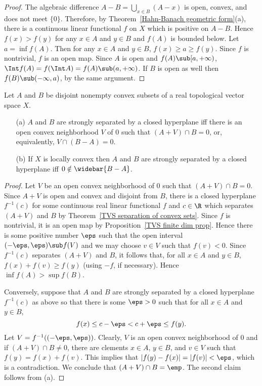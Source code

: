 \begin{proof}
The algebraic difference $A-B=\bigcup_{x\in B}(A-x)$ is open, convex, and does not meet $\{0\}$. Therefore, by Theorem~\ref{Hahn-Banach geometric form}(a), there is a continuous linear functional $f$ on $X$ which is positive on $A-B$. Hence $f(x)>f(y)$ for any $x\in A$ and $y\in B$ and $f(A)$ is bounded below. Let $a=\inf f(A)$. Then for any $x\in A$ and $y\in B$, $f(x)\geq a\geq f(y)$. Since $f$ is nontrivial, $f$ is an open map. Since $A$ is open and $f(A)\sub[a,+\infty)$, $\Int f(A)=f(\Int A)=f(A)\sub(a,+\infty)$. If $B$ is open as well then $f(B)\sub (-\infty,a)$, by the same argument.
\end{proof}
\begin{theorem}\label{TVS strong separation of convex sets}
Let $A$ and $B$ be disjoint nonempty convex subsets of a real topological vector space $X$.
\begin{itemize}
\item[(a)] $A$ and $B$ are strongly separated by a closed hyperplane iff there is an open convex neighborhood $V$ of $0$ such that $(A+V)\cap B=0$, or, equivalently, $V\cap (B-A)=0$.
\item[(b)] If $X$ is locally convex then $A$ and $B$ are strongly separated by a closed hyperplane iff $0\notin\widebar{B-A}$. 
\end{itemize}
\end{theorem}
\begin{proof}
Let $V$ be an open convex neighborhood of $0$ such that $(A+V)\cap B=0$. Since $A+V$ is open and convex and disjoint from $B$, there is a closed hyperplane $f^{-1}(c)$ for some continuous real linear functional $f$ and $c\in\R$ which separates $(A+V)$ and $B$ by Theorem~\ref{TVS separation of convex sets}. Since $f$ is nontrivial, it is an open map by Proposition~\ref{TVS finite dim prop}. Hence there is some positive number $\eps$ such that the open interval $(-\eps,\eps)\sub f(V)$ and we may choose $v\in V$ such that $f(v)<0$. Since $f^{-1}(c)$ separates $(A+V)$ and $B$, it follows that, for all $x\in A$ and $y\in B$, $f(x)+f(v)\geq f(y)$ (using $-f$, if necessary). Hence $\inf f(A)>\sup f(B)$.\par
Conversely, suppose that $A$ and $B$ are strongly separated by a closed hyperplane $f^{-1}(c)$ as above so that there is some $\eps>0$ such that for all $x\in A$ and $y\in B$,
\[f(x)\leq c-\eps<c+\eps\leq f(y).\]
Let $V=f^{-1}((-\eps,\eps))$. Clearly, $V$ is an open convex neighborhood of $0$ and if $(A+V)\cap B\neq 0$, there are clements $x\in A$, $y\in B$, and $v\in V$ such that $f(y)=f(x)+f(v)$. This implies that $|f(y)-f(x)|=|f(v)|<\eps$, which is a contradiction. We conclude that $(A+V)\cap B=\emp$. The second claim follows from (a).
\end{proof}
